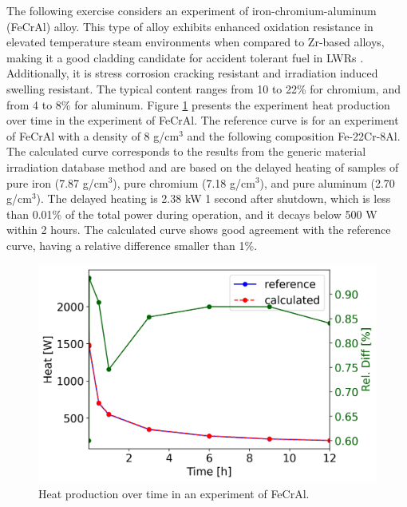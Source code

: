 The following exercise considers an experiment of iron-chromium-aluminum (FeCrAl) alloy.
This type of alloy exhibits enhanced oxidation resistance in elevated temperature steam environments when compared to Zr-based alloys, making it a good cladding candidate for accident tolerant fuel in \glspl*{LWR} \cite{field_accident_2017}.
Additionally, it is stress corrosion cracking resistant and irradiation induced swelling resistant.
The typical content ranges from 10 to 22\% for chromium, and from 4 to 8\% for aluminum.
Figure \ref{fig:atr-time-fecral} presents the experiment heat production over time in the experiment of FeCrAl.
The reference curve is for an experiment of FeCrAl with a density of 8 g/cm$^3$ and the following composition Fe-22Cr-8Al.
The calculated curve corresponds to the results from the generic material irradiation database method and are based on the delayed heating of samples of pure iron (7.87 g/cm$^3$), pure chromium (7.18 g/cm$^3$), and pure aluminum (2.70 g/cm$^3$).
The delayed heating is 2.38 kW 1 second after shutdown, which is less than 0.01\% of the total power during operation, and it decays below 500 W within 2 hours.
The calculated curve shows good agreement with the reference curve, having a relative difference smaller than 1\%.

\begin{figure}[htbp!] %
    \centering
    \includegraphics[width=0.60\linewidth]{figures/FeCrAl1-tot-vs-t}
    \hfill
    \caption{Heat production over time in an experiment of FeCrAl.}
    \label{fig:atr-time-fecral}
\end{figure}


